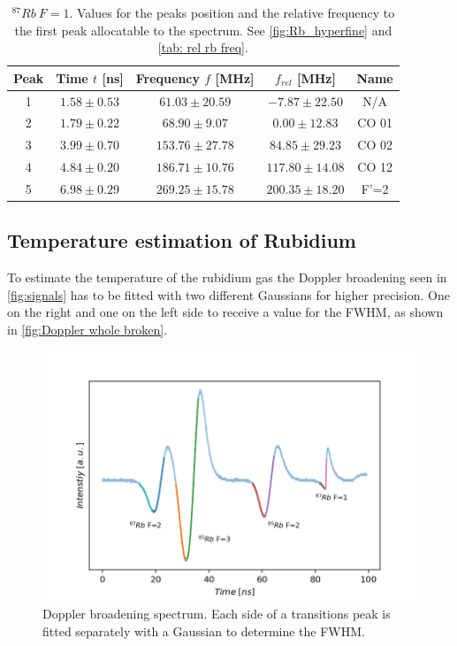 \documentclass[]{article}
\begin{document}
\begin{table}[H]
\centering
\begin{tabular}{|c|c|c|||c|c|}
\hline
Peak & Time $t$ [ns] & Frequency $f$ [MHz] & $f_{rel}$ [MHz] & Name \\ \hline\hline
1 & $1.58 \pm 0.53$  & $61.03 \pm 20.59$  & $-7.87 \pm 22.50$  & N/A \\ \hline
2 & $1.79 \pm 0.22$  & $68.90 \pm 9.07$  & $0.00 \pm 12.83$  & CO 01 \\ \hline
3 & $3.99 \pm 0.70$  & $153.76 \pm 27.78$  & $84.85 \pm 29.23$  & CO 02 \\ \hline
4 & $4.84 \pm 0.20$  & $186.71 \pm 10.76$  & $117.80 \pm 14.08$  & CO 12 \\ \hline
5 & $6.98 \pm 0.29$  & $269.25 \pm 15.78$  & $200.35 \pm 18.20$  & F'=2 \\ \hline
\hline
\end{tabular}
\caption{$^{87}Rb\ F=1 $. Values for the peaks position and the relative frequency to the first peak allocatable to the spectrum. See \autoref{fig:Rb_hyperfine} and \autoref{tab: rel rb freq}.}
\end{table}


\newpage
\subsection{Temperature estimation of Rubidium}
To estimate the temperature of the rubidium gas the Doppler broadening seen in \autoref{fig:signals} has to be fitted with two different Gaussians for higher precision. One on the right and one on the left side to receive a value for the FWHM, as shown in \autoref{fig:Doppler whole broken}.

\begin{figure}[H]
\centering
\includegraphics[width=.9\textwidth]{Plots/Doppler_whole.png}
\caption{Doppler broadening spectrum. Each side of a transitions peak is fitted separately with a Gaussian to determine the FWHM.}
\label{fig:Doppler whole broken}
\end{figure}
\end{document}
